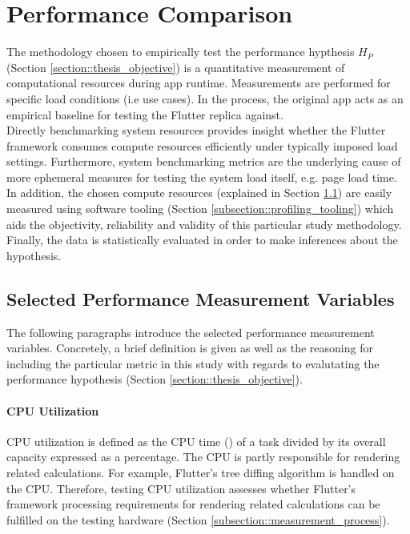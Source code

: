 \section{Performance Comparison} \label{section::performance_comparison_design}
The methodology chosen to empirically test the performance hypthesis $H_P$ (Section \ref{section::thesis_objective}) is a quantitative
measurement of computational resources during app runtime. Measurements are performed for
specific load conditions (i.e use cases). In the process, the original app acts as an empirical
baseline for testing the Flutter replica against.\\
Directly benchmarking system resources provides insight whether the Flutter framework consumes
compute resources efficiently under typically imposed load settings. Furthermore, system
benchmarking metrics are the underlying cause of more ephemeral measures for testing the
system load itself, e.g. page load time. In addition, the chosen compute resources (explained
in Section \ref{subsection::selected_measurement_variables}) are easily measured using software tooling (Section \ref{subsection::profiling_tooling}) which aids the
objectivity, reliability and validity of this particular study methodology.
Finally, the data is statistically evaluated in order to make inferences about the hypothesis.

\subsection{Selected Performance Measurement Variables} \label{subsection::selected_measurement_variables}
The following paragraphs introduce the selected performance measurement variables. Concretely,
a brief definition is given as well as the reasoning for including the particular metric in
this study with regards to evalutating the performance hypothesis (Section \ref{section::thesis_objective}).

\paragraph*{CPU Utilization}\label{paragraph::cpu_utilization}\hfill \break
CPU utilization is defined as the CPU time (\cite{FSF1988}) of a task
divided by its overall capacity expressed as a percentage. 
The CPU is partly responsible for rendering related calculations.
For example, Flutter's tree diffing algorithm is handled on the CPU.
Therefore, testing CPU utilization assesses whether Flutter's framework processing requirements for rendering related calculations can be fulfilled on the testing hardware (Section \ref{subsection::measurement_process}).

